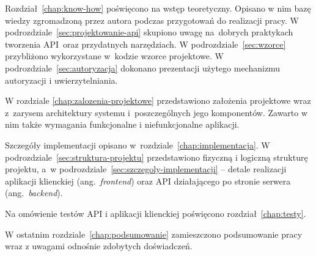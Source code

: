 Rozdział~\ref{chap:know-how} poświęcono na wstęp teoretyczny. Opisano w nim bazę wiedzy zgromadzoną przez autora podczas przygotowań do realizacji pracy. W podrozdziale~\ref{sec:projektowanie-api} skupiono uwagę na~dobrych praktykach tworzenia API~oraz przydatnych narzędziach. W podrozdziale~\ref{sec:wzorce} przybliżono wykorzystane w~kodzie wzorce projektowe. W podrozdziale~\ref{sec:autoryzacja} dokonano prezentacji użytego mechanizmu autoryzacji i uwierzytelniania.

W rozdziale \ref{chap:zalozenia-projektowe} przedstawiono założenia projektowe wraz z~zarysem architektury systemu i~poszczególnych jego komponentów. Zawarto w nim także wymagania funkcjonalne i niefunkcjonalne aplikacji.

Szczegóły implementacji opisano w~rozdziale~\ref{chap:implementacja}. W podrozdziale~\ref{sec:struktura-projektu} przedstawiono fizyczną i logiczną strukturę projektu, a~w podrozdziale~\ref{sec:szczegoly-implementacji} -- detale realizacji aplikacji klienckiej (ang.~\emph{frontend}) oraz API działającego po stronie serwera (ang.~\emph{backend}).

Na omówienie testów API i aplikacji klienckiej poświęcono rozdział~\ref{chap:testy}. 

W ostatnim rozdziale~\ref{chap:podsumowanie} zamieszczono podsumowanie pracy wraz z uwagami odnośnie zdobytych doświadczeń.